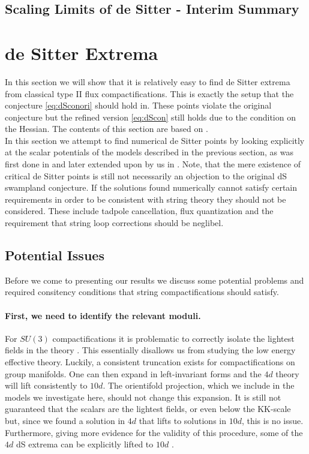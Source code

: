 \documentclass[12pt]{report}
\begin{document}
\subsection{Scaling Limits of de Sitter - Interim Summary}

\section{de Sitter Extrema}
\label{sec:dSextrema}
In this section we will show that it is relatively easy to find de Sitter extrema from classical type II flux compactifications. This is exactly the setup that the conjecture \eqref{eq:dSconori} should hold in. These points violate the original conjecture but the refined version \eqref{eq:dScon} still holds due to the condition on the Hessian. The contents of this section are based on \cite{Roupec:2018mbn}.\\
In this section we attempt to find numerical de Sitter points by looking explicitly at the scalar potentials of the models described in the previous section, as was first done in \cite{Caviezel:2008tf,Flauger:2008ad} and later extended upon by us in \cite{Roupec:2018mbn}. Note, that the mere existence of critical de Sitter points is still not necessarily an objection to the original dS swampland conjecture. If the solutions found numerically cannot satisfy certain requirements in order to be consistent with string theory they should not be considered. These include tadpole cancellation, flux quantization and the requirement that string loop corrections should be neglibel.

\subsection{Potential Issues}
\label{sec:stringrequ}
Before we come to presenting our results we discuss some potential problems and required consitency conditions that string compactifications should satisfy.
\paragraph{First, we need to identify the relevant moduli.} For $SU(3)$ compactifications it is problematic to correctly isolate the lightest fields in the theory \cite{Kashani-Poor:2006ofe,Kashani-Poor:2007nby}. This essentially disallows us from studying the low energy effective theory. Luckily, a consistent truncation exists \cite{Cassani:2009ck} for compactifications on group manifolds. One can then expand in left-invariant forms and the $4d$ theory will lift consistently to $10d$. The orientifold projection, which we include in the models we investigate here, should not change this expansion. It is still not guaranteed that the scalars are the lightest fields, or even below the KK-scale \cite{Andriot:2018wzk} but, since we found a solution in $4d$ that lifts to solutions in $10d$, this is no issue. Furthermore, giving more evidence for the validity of this procedure, some of the $4d$ dS extrema can be explicitly lifted to $10d$ \cite{Danielsson:2010bc}.
\end{document}
